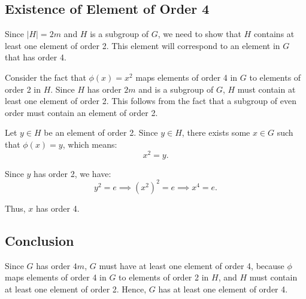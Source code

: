 \documentclass[12pt]{amsart}
\theoremstyle{definition}
\numberwithin{equation}{section}
\begin{document}
\begin{exercise}{6}
    \subsection*{Existence of Element of Order 4}
    
    Since \(|H| = 2m\) and \(H\) is a subgroup of \(G\), we need to show that \(H\) contains at least one element of order 2. This element will correspond to an element in \(G\) that has order 4.
    
    Consider the fact that \(\phi(x) = x^2\) maps elements of order 4 in \(G\) to elements of order 2 in \(H\). Since \(H\) has order \(2m\) and is a subgroup of \(G\), \(H\) must contain at least one element of order 2. This follows from the fact that a subgroup of even order must contain an element of order 2.
    
    Let \(y \in H\) be an element of order 2. Since \(y \in H\), there exists some \(x \in G\) such that \(\phi(x) = y\), which means:
    \[
    x^2 = y.
    \]
    
    Since \(y\) has order 2, we have:
    \[
    y^2 = e \implies (x^2)^2 = e \implies x^4 = e.
    \]
    
    Thus, \(x\) has order 4.
    
    \subsection*{Conclusion}
    
    Since \(G\) has order \(4m\), \(G\) must have at least one element of order 4, because \(\phi\) maps elements of order 4 in \(G\) to elements of order 2 in \(H\), and \(H\) must contain at least one element of order 2. Hence, \(G\) has at least one element of order 4.
    
\end{exercise}
\newpage
\end{document}
